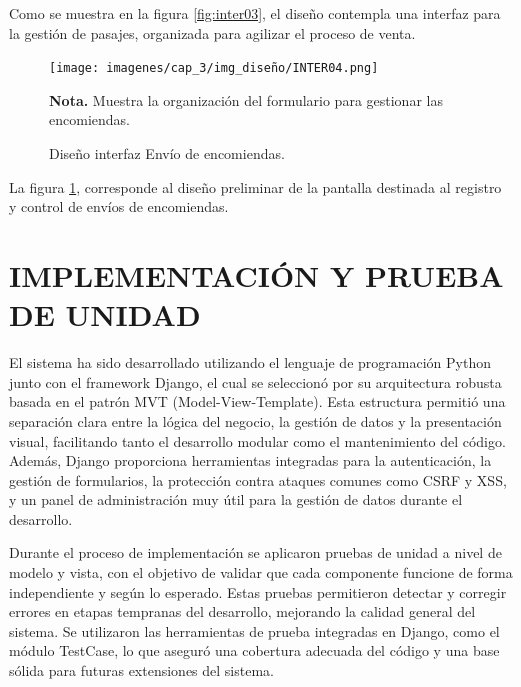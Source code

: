	Como se muestra en la figura \ref{fig:inter03}, el diseño contempla una interfaz para la gestión de pasajes, organizada para agilizar el proceso de venta.
	
	\begin{figure}[!h] %
		\caption[Diseño interfaz Envío de encomiendas]
		{\newline Diseño interfaz Envío de encomiendas.} %
		\centering
		\texttt{[image: imagenes/cap\_3/img\_diseño/INTER04.png]} %
		\begin{flushleft}
			\hspace{1.20cm} \textbf{Nota.} Muestra la organización del formulario para gestionar las encomiendas. %
		\end{flushleft}
		\vspace{-1pt}
		\label{fig:inter04} %
	\end{figure}
	\vspace{-0.6cm} %
	
	La figura \ref{fig:inter04}, corresponde al diseño preliminar de la pantalla destinada al registro y control de envíos de encomiendas.		
		
\section{IMPLEMENTACIÓN Y PRUEBA DE UNIDAD}

	El sistema ha sido desarrollado utilizando el lenguaje de programación Python junto con el framework Django, el cual se seleccionó por su arquitectura robusta basada en el patrón MVT (Model-View-Template). Esta estructura permitió una separación clara entre la lógica del negocio, la gestión de datos y la presentación visual, facilitando tanto el desarrollo modular como el mantenimiento del código. Además, Django proporciona herramientas integradas para la autenticación, la gestión de formularios, la protección contra ataques comunes como CSRF y XSS, y un panel de administración muy útil para la gestión de datos durante el desarrollo.
	
	Durante el proceso de implementación se aplicaron pruebas de unidad a nivel de modelo y vista, con el objetivo de validar que cada componente funcione de forma independiente y según lo esperado. Estas pruebas permitieron detectar y corregir errores en etapas tempranas del desarrollo, mejorando la calidad general del sistema. Se utilizaron las herramientas de prueba integradas en Django, como el módulo TestCase, lo que aseguró una cobertura adecuada del código y una base sólida para futuras extensiones del sistema.
	
